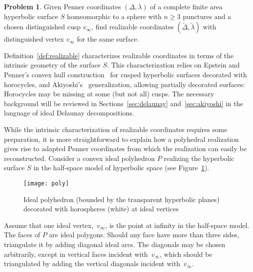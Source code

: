 \documentclass[a4paper, 11pt]{article}
\newcommand{\Deltil}{\widetilde{\Delta}}
\newcommand{\lamtil}{\tilde{\lambda}}
\theoremstyle{plain}
\theoremstyle{definition}
\newtheorem{problem}[theorem]{Problem}
\begin{document}
\begin{problem}
  \label{prob:realize2}
  Given Penner coordinates $(\Delta,\lambda)$ of a complete finite
  area hyperbolic surface $S$ homeomorphic to a sphere with $n\geq 3$
  punctures and a chosen distinguished cusp $v_{\infty}$, find
  realizable coordinates $(\Deltil,\lamtil)$ with distinguished vertex
  $v_{\infty}$ for the same surface.
\end{problem}

Definition~\ref{def:realizable} characterizes realizable coordinates
in terms of the intrinsic geometry of the surface $S$. This
characterization relies on Epstein and Penner's convex hull
construction~\cite{epstein88,penner87,penner12} for cusped hyperbolic
surfaces decorated with horocycles, and Akiyoshi's~\cite{akiyoshi01}
generalization, allowing partially decorated surfaces: Horocycles may
be missing at some (but not all) cusps. The necessary background will
be reviewed in Sections~\ref{sec:delaunay} and~\ref{sec:akiyoshi} in
the language of ideal Delaunay decompositions.

While the intrinsic characterization of realizable coordinates
requires some preparation, it is more straightforward to explain how a
polyhedral realization gives rise to adapted Penner coordinates
from which the realization can easily be reconstructed. Consider a
convex ideal polyhedron $P$ realizing the hyperbolic surface $S$ in
the half-space model of hyperbolic space (see Figure~\ref{fig:poly}).
\begin{figure}
  \centering
  \texttt{[image: poly]}
  \caption{Ideal polyhedron (bounded by the transparent hyperbolic
    planes) decorated with horospheres (white) at ideal vertices}
  \label{fig:poly}
\end{figure}
Assume that one ideal vertex,~$v_{\infty}$, is the point at infinity
in the half-space model. The faces of $P$ are ideal polygons. Should
any face have more than three sides, triangulate it by adding diagonal
ideal arcs. The diagonals may be chosen arbitrarily, except in
vertical faces incident with~$v_{\infty}$, which should be
triangulated by adding the vertical diagonals incident
with~$v_{\infty}$.
\end{document}

